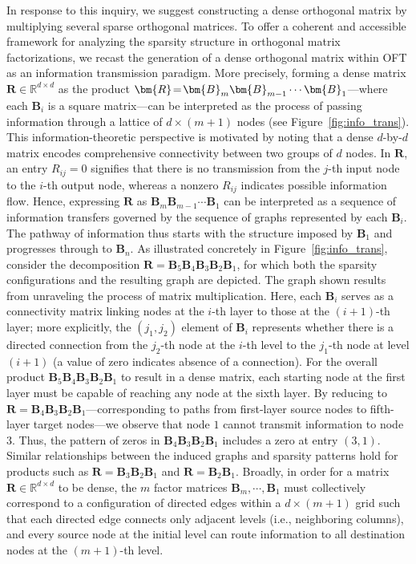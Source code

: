 In response to this inquiry, we suggest constructing a dense orthogonal matrix by multiplying several sparse orthogonal matrices. To offer a coherent and accessible framework for analyzing the sparsity structure in orthogonal matrix factorizations, we recast the generation of a dense orthogonal matrix within OFT as an information transmission paradigm. More precisely, forming a dense matrix $\bm{R}\in\mathbb{R}^{d\times d}$ as the product $\thickmuskip=2mu \medmuskip=2mu \bm{R}=\bm{B}_m\bm{B}_{m-1}\cdots\bm{B}_1$—where each $\bm{B}_i$ is a square matrix—can be interpreted as the process of passing information through a lattice of $d\times (m+1)$ nodes (see Figure~\ref{fig:info_trans}). This information-theoretic perspective is motivated by noting that a dense $d$-by-$d$ matrix encodes comprehensive connectivity between two groups of $d$ nodes. In $\bm{R}$, an entry $R_{ij}=0$ signifies that there is no transmission from the $j$-th input node to the $i$-th output node, whereas a nonzero $R_{ij}$ indicates possible information flow. Hence, expressing $\bm{R}$ as $\bm{B}_m\bm{B}_{m-1}\cdots\bm{B}_1$ can be interpreted as a sequence of information transfers governed by the sequence of graphs represented by each $\bm{B}_i$. The pathway of information thus starts with the structure imposed by $\bm{B}_1$ and progresses through to $\bm{B}_n$. As illustrated concretely in Figure~\ref{fig:info_trans}, consider the decomposition $\bm{R}=\bm{B}_5\bm{B}_4\bm{B}_3\bm{B}_2\bm{B}_1$, for which both the sparsity configurations and the resulting graph are depicted. The graph shown results from unraveling the process of matrix multiplication. Here, each $\bm{B}_i$ serves as a connectivity matrix linking nodes at the $i$-th layer to those at the $(i+1)$-th layer; more explicitly, the $(j_1,j_2)$ element of $\bm{B}_i$ represents whether there is a directed connection from the $j_2$-th node at the $i$-th level to the $j_1$-th node at level $(i+1)$ (a value of zero indicates absence of a connection). For the overall product $\bm{B}_5\bm{B}_4\bm{B}_3\bm{B}_2\bm{B}_1$ to result in a dense matrix, each starting node at the first layer must be capable of reaching any node at the sixth layer. By reducing to $\bm{R}=\bm{B}_4\bm{B}_3\bm{B}_2\bm{B}_1$—corresponding to paths from first-layer source nodes to fifth-layer target nodes—we observe that node $1$ cannot transmit information to node $3$. Thus, the pattern of zeros in $\bm{B}_4\bm{B}_3\bm{B}_2\bm{B}_1$ includes a zero at entry $(3,1)$. Similar relationships between the induced graphs and sparsity patterns hold for products such as $\bm{R}=\bm{B}_3\bm{B}_2\bm{B}_1$ and $\bm{R}=\bm{B}_2\bm{B}_1$. Broadly, in order for a matrix $\bm{R}\in\mathbb{R}^{d\times d}$ to be dense, the $m$ factor matrices $\bm{B}_m,\cdots,\bm{B}_1$ must collectively correspond to a configuration of directed edges within a $d\times (m+1)$ grid such that each directed edge connects only adjacent levels (i.e., neighboring columns), and every source node at the initial level can route information to all destination nodes at the $(m+1)$-th level.

